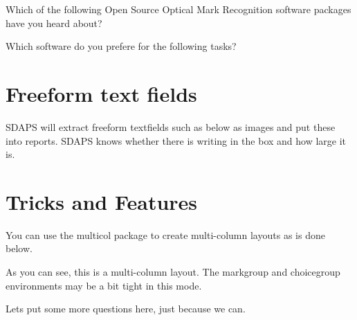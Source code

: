 \documentclass[
  english,
  ]{sdapsclassic}
\begin{document}
\begin{questionnaire}
\begin{choicequestion}[cols=3]{Which of the following Open Source
                                   Optical Mark Recognition software
                                   packages have you heard about?}
    \end{choicequestion}

    \begin{choicegroup}{Which software do you prefere for the following tasks?}
      \groupaddchoice{\LaTeX}

    \end{choicegroup}

    \section{Freeform text fields}

    SDAPS will extract freeform textfields such as below as images and put
    these into reports. SDAPS knows whether there is writing in the box and
    how large it is.


    \newpage
    \section{Tricks and Features}
    You can use the {\ttfamily multicol} package to create multi-column layouts
    as is done below.

    \begin{multicols}{2}

      As you can see, this is a multi-column layout. The {\ttfamily markgroup} and
      {\ttfamily choicegroup} environments may be a bit tight in this mode.

      Lets put some more questions here, just because we can.


\end{multicols}
\end{questionnaire}
\end{document}

